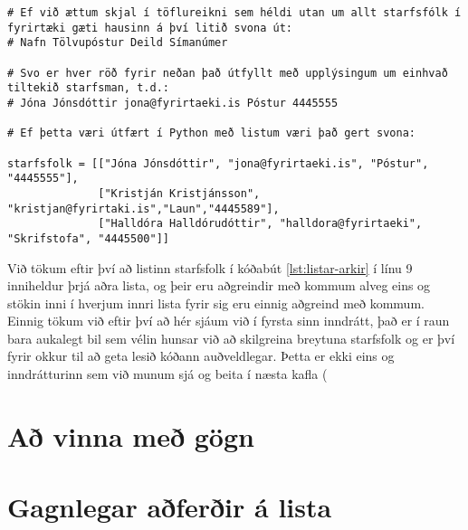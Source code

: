 \begin{lstlisting}[caption=Listar af listum, label=lst:listar-arkir]
# Ef við ættum skjal í töflureikni sem héldi utan um allt starfsfólk í fyrirtæki gæti hausinn á því litið svona út:
# Nafn Tölvupóstur Deild Símanúmer 

# Svo er hver röð fyrir neðan það útfyllt með upplýsingum um einhvað tiltekið starfsman, t.d.:
# Jóna Jónsdóttir jona@fyrirtaeki.is Póstur 4445555

# Ef þetta væri útfært í Python með listum væri það gert svona:

starfsfolk = [["Jóna Jónsdóttir", "jona@fyrirtaeki.is", "Póstur", "4445555"],
			  ["Kristján Kristjánsson", "kristjan@fyrirtaki.is","Laun","4445589"],
			  ["Halldóra Halldórudóttir", "halldora@fyrirtaeki", "Skrifstofa", "4445500"]]

\end{lstlisting}

Við tökum eftir því að listinn starfsfolk í kóðabút \ref{lst:listar-arkir} í línu 9 inniheldur þrjá aðra lista, og þeir eru aðgreindir með kommum alveg eins og stökin inni í hverjum innri lista fyrir sig eru einnig aðgreind með kommum.
Einnig tökum við eftir því að hér sjáum við í fyrsta sinn inndrátt, það er í raun bara aukalegt bil sem vélin hunsar við að skilgreina breytuna starfsfolk og er því fyrir okkur til að geta lesið kóðann auðveldlegar.
Þetta er ekki eins og inndrátturinn sem við munum sjá og beita í næsta kafla (
 
\section{Að vinna með gögn}\label{uk:gagnavinnsla-listar}

\section{Gagnlegar aðferðir á lista}\label{uk:aðferðir-listar}